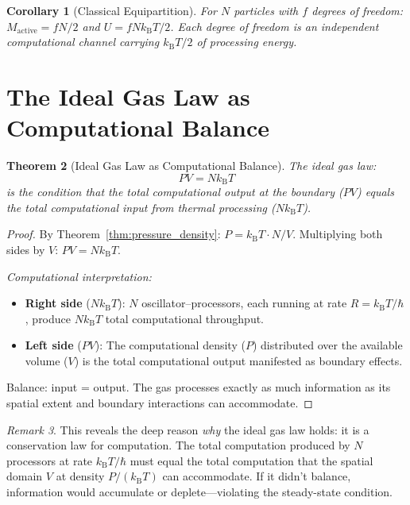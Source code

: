 \documentclass[twocolumn,10pt,a4paper]{article}
\theoremstyle{plain}
\newtheorem{theorem}{Theorem}[section]
\newtheorem{corollary}[theorem]{Corollary}
\theoremstyle{definition}
\theoremstyle{remark}
\newtheorem{remark}[theorem]{Remark}
\newcommand{\kB}{k_{\mathrm{B}}}
\begin{document}
\begin{corollary}[Classical Equipartition]
For $N$ particles with $f$ degrees of freedom: $M_{\mathrm{active}} = fN/2$ and $U = fN\kB T/2$. Each degree of freedom is an independent computational channel carrying $\kB T/2$ of processing energy.
\end{corollary}

\section{The Ideal Gas Law as Computational Balance}
\label{sec:gas_law_computation}

\begin{theorem}[Ideal Gas Law as Computational Balance]
\label{thm:gas_computation}
The ideal gas law:
\begin{equation}
\boxed{PV = N\kB T}
\end{equation}
is the condition that the total computational output at the boundary ($PV$) equals the total computational input from thermal processing ($N\kB T$).
\end{theorem}

\begin{proof}
By Theorem~\ref{thm:pressure_density}: $P = \kB T \cdot N/V$. Multiplying both sides by $V$: $PV = N\kB T$.

\emph{Computational interpretation:}
\begin{itemize}
    \item \textbf{Right side} ($N\kB T$): $N$ oscillator--processors, each running at rate $R = \kB T/\hbar$, produce $N\kB T$ total computational throughput.
    \item \textbf{Left side} ($PV$): The computational density ($P$) distributed over the available volume ($V$) is the total computational output manifested as boundary effects.
\end{itemize}
Balance: input = output. The gas processes exactly as much information as its spatial extent and boundary interactions can accommodate.
\end{proof}

\begin{remark}
This reveals the deep reason \emph{why} the ideal gas law holds: it is a conservation law for computation. The total computation produced by $N$ processors at rate $\kB T/\hbar$ must equal the total computation that the spatial domain $V$ at density $P/(\kB T)$ can accommodate. If it didn't balance, information would accumulate or deplete---violating the steady-state condition.
\end{remark}
\end{document}
